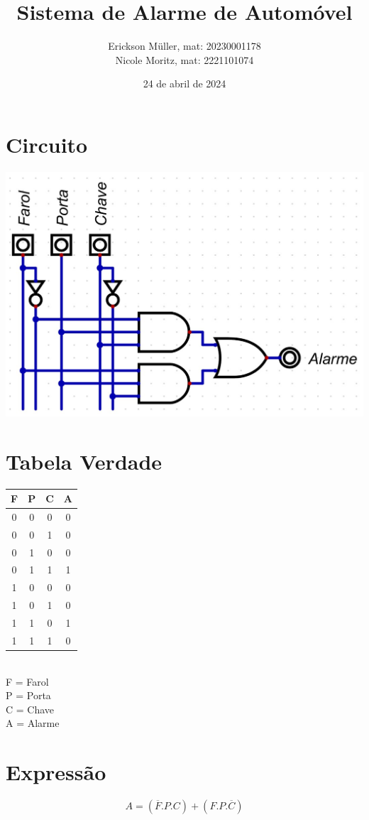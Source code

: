 \documentclass[]{article}
\title{Sistema de Alarme de Automóvel}
\author{Erickson Müller, mat: 20230001178\\ Nicole Moritz, mat: 2221101074}
\date{24 de abril de 2024}
\begin{document}
	\maketitle
	\pagebreak
	\section{Circuito}
		\includegraphics[scale=0.5]{Images/Circuito Alarme.jpg}
	\section{Tabela Verdade}
		\hspace*{4cm}
		\begin{tabular}{|c|c|c|c|}
			\hline
			\textbf{ F } & \textbf{ P } & \textbf{ C } & \textbf{ A } \\
			\hline
			0 & 0 & 0 & 0 \\
			\hline
			0 & 0 & 1 & 0 \\
			\hline
			0 & 1 & 0 & 0 \\
			\hline
			0 & 1 & 1 & 1 \\
			\hline
			1 & 0 & 0 & 0 \\
			\hline
			1 & 0 & 1 & 0 \\
			\hline
			1 & 1 & 0 & 1 \\
			\hline
			1 & 1 & 1 & 0 \\
			\hline
		\end{tabular}
	\\
	F = Farol \\ P = Porta \\ C = Chave \\ A = Alarme
	\pagebreak
	\section{Expressão}
		\begin{equation*}
			A = (\overline{F}.P.C) + (F.P.\overline{C})
		\end{equation*}
\end{document}
